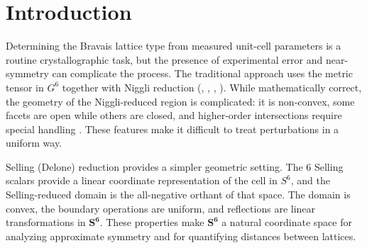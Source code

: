 \documentclass[preprint]{iucr}              %
\newcommand{\SVI}[0]{$\mathbf{S^{6}}$}
\begin{document}
	
	
	
	\begin{abstract}
		SELLA is a straightforward algorithm for determining Bravais lattice type
		based on Selling (Delone) reduction. Each Bravais type
		as one or more linear subspaces in the six-dimensional space $S^6$ of Selling
		scalars. Distances from a probe cell to these subspaces are computed using
		projectors and their orthogonal complements, giving a clear metric of fit.
		The geometry of $S^6$ provides a simple, convex reduced domain, making it
		well suited for treating experimental error and approximate symmetry. The
		24 Delone types described by Delaunay (1932) appear naturally in this
		framework. Examples and tests against large data sets are included.
		
		Boris Nikolaevich Delone, whose surname
		also appears in the French form ``Delaunay'' in early Western publications, did not
		change his name; the variation reflects differing transliteration conventions.
		
		
	\end{abstract}
	
	\section{Introduction}
	
	Determining the Bravais lattice type from measured unit-cell parameters is a
	routine crystallographic task, but the presence of experimental error and
	near-symmetry can complicate the process. The traditional approach uses the
	metric tensor in $G^6$ together with Niggli reduction (, ,
	, ). While
	mathematically correct, the geometry of the Niggli-reduced region is
	complicated: it is non-convex, some facets are open while others are closed,
	and higher-order intersections require special handling \cite{Andrews2014}. These features make
	it difficult to treat perturbations in a uniform way.
	
	Selling (Delone) reduction provides a simpler geometric setting. The 6 Selling scalars provide a linear coordinate representation of the cell in $S^6$, and the Selling-reduced
	domain is the all-negative orthant of that space. The domain is convex, the
	boundary operations are uniform, and reflections are linear transformations in \SVI{}. These properties make \SVI{}
	a natural coordinate space for analyzing approximate symmetry and for quantifying distances between lattices.
	
\end{document}
